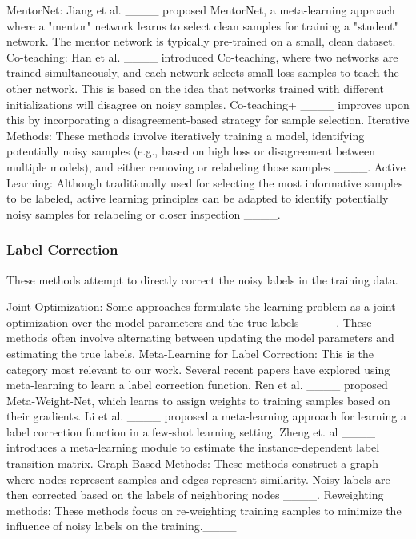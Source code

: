 MentorNet:  Jiang et al. ____ proposed MentorNet, a meta-learning approach where a "mentor" network learns to select clean samples for training a "student" network.  The mentor network is typically pre-trained on a small, clean dataset.
Co-teaching: Han et al. ____ introduced Co-teaching, where two networks are trained simultaneously, and each network selects small-loss samples to teach the other network. This is based on the idea that networks trained with different initializations will disagree on noisy samples. Co-teaching+ ____ improves upon this by incorporating a disagreement-based strategy for sample selection.
Iterative Methods:  These methods involve iteratively training a model, identifying potentially noisy samples (e.g., based on high loss or disagreement between multiple models), and either removing or relabeling those samples ____.
Active Learning: Although traditionally used for selecting the most informative samples to be labeled, active learning principles can be adapted to identify potentially noisy samples for relabeling or closer inspection ____.

\subsubsection{Label Correction}
\label{sec:related_noisy_label}

These methods attempt to directly correct the noisy labels in the training data.

Joint Optimization: Some approaches formulate the learning problem as a joint optimization over the model parameters and the true labels ____. These methods often involve alternating between updating the model parameters and estimating the true labels.
Meta-Learning for Label Correction:  This is the category most relevant to our work. Several recent papers have explored using meta-learning to learn a label correction function.  Ren et al. ____ proposed Meta-Weight-Net, which learns to assign weights to training samples based on their gradients.  Li et al. ____ proposed a meta-learning approach for learning a label correction function in a few-shot learning setting. Zheng et. al ____ introduces a meta-learning module to estimate the instance-dependent label transition matrix.
Graph-Based Methods:  These methods construct a graph where nodes represent samples and edges represent similarity. Noisy labels are then corrected based on the labels of neighboring nodes ____.
Reweighting methods: These methods focus on re-weighting training samples to minimize the influence of noisy labels on the training.____


